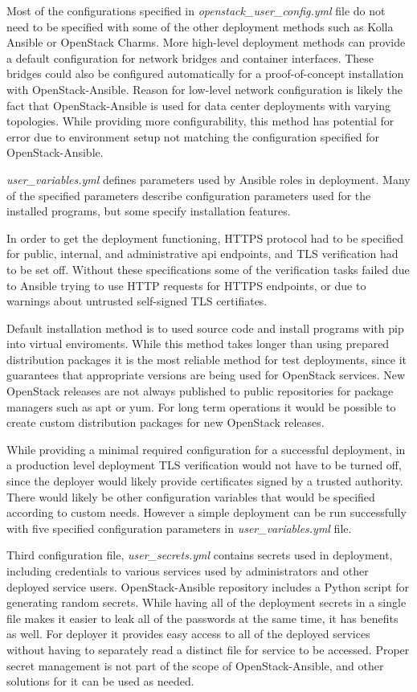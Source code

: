 Most of the configurations specified in \textit{openstack\_user\_config.yml}
file do not need to be specified with some of the other deployment methods such
as Kolla Ansible or OpenStack Charms. More high-level deployment methods can
provide a default configuration for network bridges and container interfaces.
These bridges could also be configured automatically for a proof-of-concept
installation with OpenStack-Ansible. Reason for low-level network configuration
is likely the fact that OpenStack-Ansible is used for data center deployments
with varying topologies. While providing more configurability, this method has
potential for error due to environment setup not matching the configuration
specified for OpenStack-Ansible.

\textit{user\_variables.yml} defines parameters used by Ansible roles in
deployment. Many of the specified parameters describe configuration parameters
used for the installed programs, but some specify installation features.

In order to get the deployment functioning, HTTPS protocol had to be specified
for public, internal, and administrative api endpoints, and TLS verification
had to be set off. Without these specifications some of the verification tasks
failed due to Ansible trying to use HTTP requests for HTTPS endpoints, or due
to warnings about untrusted self-signed TLS certifiates.

Default installation method is to used source code and install programs with
pip into virtual enviroments. While this method takes longer than using
prepared distribution packages it is the most reliable method for test
deployments, since it guarantees that appropriate versions are being used for
OpenStack services. New OpenStack releases are not always published to public
repositories for package managers such as apt or yum. For long term operations
it would be possible to create custom distribution packages for new OpenStack
releases.

While providing a minimal required configuration for a successful deployment,
in a production level deployment TLS verification would not have to be turned
off, since the deployer would likely provide certificates signed by a trusted
authority. There would likely be other configuration variables that would be
specified according to custom needs. However a simple deployment can be run
successfully with five specified configuration parameters in
\textit{user\_variables.yml} file.

Third configuration file, \textit{user\_secrets.yml} contains secrets used in
deployment, including credentials to various services used by administrators
and other deployed service users. OpenStack-Ansible repository includes a
Python script for generating random secrets. While having all of the deployment
secrets in a single file makes it easier to leak all of the passwords at the
same time, it has benefits as well. For deployer it provides easy access to all
of the deployed services without having to separately read a distinct file for
service to be accessed. Proper secret management is not part of the scope of
OpenStack-Ansible, and other solutions for it can be used as needed.

